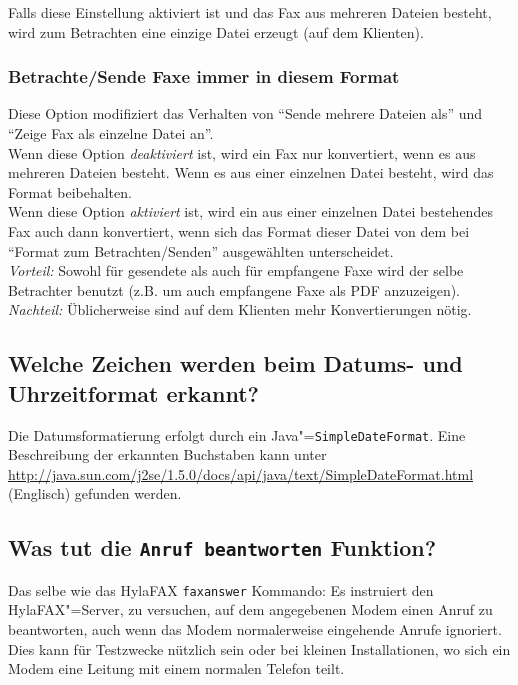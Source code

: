 \documentclass[a4paper,10pt,halfparskip,noparindent]{scrartcl}
\begin{document}
Falls diese Einstellung aktiviert ist und das Fax aus mehreren Dateien besteht, wird zum Betrachten eine einzige Datei erzeugt (auf dem Klienten).


\subsubsection{Betrachte/Sende Faxe immer in diesem Format}

Diese Option modifiziert das Verhalten von "`Sende mehrere Dateien als"' und "`Zeige Fax als einzelne Datei an"'.\\
Wenn diese Option \textit{deaktiviert} ist, wird ein Fax nur konvertiert, wenn es aus mehreren Dateien besteht. Wenn es aus einer einzelnen Datei besteht, wird das Format beibehalten.\\
Wenn diese Option \textit{aktiviert} ist, wird ein aus einer einzelnen Datei bestehendes Fax auch dann konvertiert, wenn sich das Format dieser Datei von dem bei "`Format zum Betrachten/Senden"' ausgewählten unterscheidet.\\
\textit{Vorteil:} Sowohl für gesendete als auch für empfangene Faxe wird der selbe Betrachter benutzt (z.B. um auch empfangene Faxe als PDF anzuzeigen).\\
\textit{Nachteil:} Üblicherweise sind auf dem Klienten mehr Konvertierungen nötig.


\subsection{Welche Zeichen werden beim Datums- und Uhrzeitformat erkannt?}

Die Datumsformatierung erfolgt durch ein Java"=\texttt{SimpleDateFormat}. Eine Beschreibung der erkannten Buchstaben kann unter \url{http://java.sun.com/j2se/1.5.0/docs/api/java/text/SimpleDateFormat.html} (Englisch) gefunden werden.

\subsection{Was tut die \texttt{Anruf beantworten} Funktion?}

Das selbe wie das HylaFAX \verb#faxanswer# Kommando: Es instruiert den HylaFAX"=Server, zu versuchen, auf dem angegebenen Modem einen Anruf zu beantworten, auch wenn das Modem normalerweise eingehende Anrufe ignoriert.
Dies kann für Testzwecke nützlich sein oder bei kleinen Installationen, wo sich ein Modem eine Leitung mit einem normalen Telefon teilt.
\end{document}
